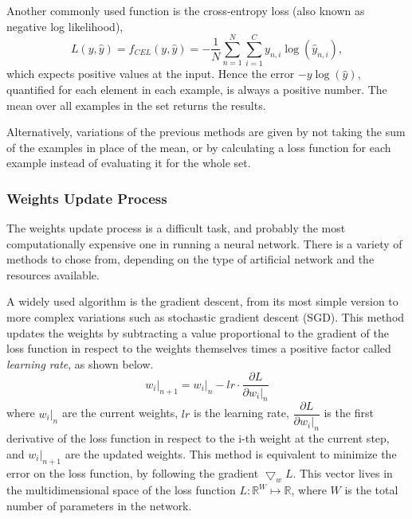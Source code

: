 Another commonly used function is the cross-entropy loss (also known as negative log likelihood),
\begin{equation}
	L(y, \hat{y}) = f_{CEL}(y, \hat{y}) = - \frac{1}{N} \sum_{n=1}^N \sum_{i=1}^C y_{n,i} \log \left( \hat{y}_{n,i} \right),
\end{equation}
which expects positive values at the input.
Hence the error $-y\log \left( \hat{y} \right)$, quantified for each element in each example, is always a positive number.
The mean over all examples in the set returns the results.

Alternatively, variations of the previous methods are given by not taking the sum of the examples in place of the mean, or by calculating a loss function for each example instead of evaluating it for the whole set.

\subsubsection{Weights Update Process}
\label{sssec:Weights_Update_Process}

The weights update process is a difficult task, and probably the most computationally expensive one in running a neural network.
There is a variety of methods to chose from, depending on the type of artificial network and the resources available.

A widely used algorithm is the gradient descent, from its most simple version to more complex variations such as stochastic gradient descent (SGD).
This method updates the weights by subtracting a value proportional to the gradient of the loss function in respect to the weights themselves times a positive factor called \textit{learning rate}, as shown below.
\begin{equation}
	\left.w_i\right|_{n+1} = \left.w_i\right|_n - lr \cdot \frac{\partial L}{\partial \left.w_i\right|_n}
\end{equation}
where $\left.w_i\right|_{n}$ are the current weights, $lr$ is the learning rate, $\dfrac{\partial L}{\partial \left.w_i\right|_n}$ is the first derivative of the loss function in respect to the i-th weight at the current step, and $\left.w_i\right|_{n+1}$ are the updated weights.
This method is equivalent to minimize the error on the loss function, by following the gradient $\bigtriangledown_w L$.
This vector lives in the multidimensional space of the loss function $L:\mathbb{R}^W \mapsto \mathbb{R}$, where $W$ is the total number of parameters in the network.

